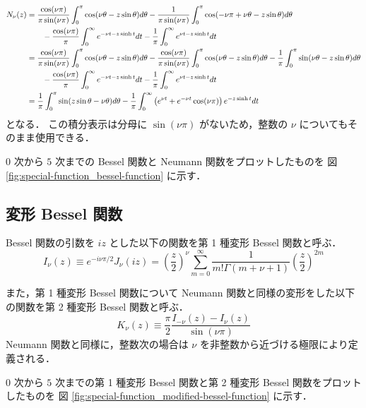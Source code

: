 \begin{align}
    N_{\nu}(z)
     & =
    \frac{\cos(\nu \pi)}{\pi \sin(\nu \pi)} \int_0^\pi \cos(\nu \theta - z \sin \theta) d\theta
    - \frac{1}{\pi \sin(\nu \pi)} \int_0^\pi \cos(-\nu \pi + \nu \theta - z \sin \theta) d\theta
    \notag \\ &\hspace{2em}
    - \frac{\cos(\nu \pi)}{\pi} \int_0^\infty e^{-\nu t -z \sinh{t}} dt
    - \frac{1}{\pi} \int_0^\infty e^{\nu t -z \sinh{t}} dt
    \\
     & =
    \frac{\cos(\nu \pi)}{\pi \sin(\nu \pi)} \int_0^\pi \cos(\nu \theta - z \sin \theta) d\theta
    - \frac{\cos(\nu \pi)}{\pi \sin(\nu \pi)} \int_0^\pi \cos(\nu \theta - z \sin \theta) d\theta
    - \frac{1}{\pi} \int_0^\pi \sin(\nu \theta - z \sin \theta) d\theta
    \notag \\ &\hspace{2em}
    - \frac{\cos(\nu \pi)}{\pi} \int_0^\infty e^{-\nu t -z \sinh{t}} dt
    - \frac{1}{\pi} \int_0^\infty e^{\nu t -z \sinh{t}} dt
    \\
     & =
    \frac{1}{\pi} \int_0^\pi \sin(z \sin \theta - \nu \theta) d\theta
    - \frac{1}{\pi} \int_0^\infty \left(e^{\nu t} + e^{-\nu t} \cos(\nu \pi)\right) e^{-z \sinh{t}} dt
\end{align}
となる．
この積分表示は分母に $\sin(\nu \pi)$ がないため，整数の $\nu$ についてもそのまま使用できる．

$0$ 次から $5$ 次までの Bessel 関数と Neumann 関数をプロットしたものを
図 \ref{fig:special-function_bessel-function} に示す．

\subsection{変形 Bessel 関数}

Bessel 関数の引数を $iz$ とした以下の関数を第 1 種変形 Bessel 関数と呼ぶ．
\begin{equation}
    I_{\nu}(z) \equiv e^{-i \nu \pi / 2} J_{\nu}(iz)
    = \left(\frac{z}{2}\right)^{\nu}
    \sum_{m = 0}^{\infty} \frac{1}{m! \Gamma(m + \nu + 1)}
    \left(\frac{z}{2}\right)^{2m}
\end{equation}

また，第 1 種変形 Bessel 関数について Neumann 関数と同様の変形をした以下の関数を第 2 種変形 Bessel 関数と呼ぶ．
\begin{equation}
    K_{\nu}(z) \equiv \frac{\pi}{2} \frac{I_{-\nu}(z) - I_{\nu}(z)}{\sin(\nu \pi)}
\end{equation}
Neumann 関数と同様に，整数次の場合は $\nu$ を非整数から近づける極限により定義される．

$0$ 次から $5$ 次までの第 1 種変形 Bessel 関数と第 2 種変形 Bessel 関数をプロットしたものを
図 \ref{fig:special-function_modified-bessel-function} に示す．
